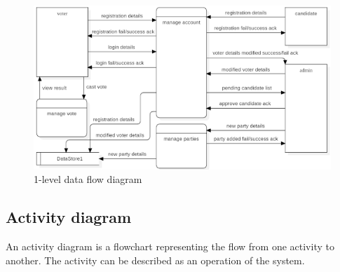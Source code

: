 \begin{figure}[tbh] %
\begin{center}
	\includegraphics[width = 5.5in]{images/1-leveldfd.png}
	\caption{1-level data flow diagram} %
	\label{figSample1} %
\end{center}
\end{figure}

\subsection{Activity diagram}
An activity diagram is a flowchart representing the flow from one activity to another. The activity can be described as an operation of the system.

